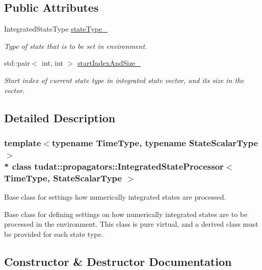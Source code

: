 \subsection*{Public Attributes}
\begin{DoxyCompactItemize}
\item 
Integrated\+State\+Type \hyperlink{classtudat_1_1propagators_1_1IntegratedStateProcessor_aa37431c3c4e60e9f922cc70737d5de47}{state\+Type\+\_\+}\hypertarget{classtudat_1_1propagators_1_1IntegratedStateProcessor_aa37431c3c4e60e9f922cc70737d5de47}{}\label{classtudat_1_1propagators_1_1IntegratedStateProcessor_aa37431c3c4e60e9f922cc70737d5de47}

\begin{DoxyCompactList}\small\item\em Type of state that is to be set in environment. \end{DoxyCompactList}\item 
std\+::pair$<$ int, int $>$ \hyperlink{classtudat_1_1propagators_1_1IntegratedStateProcessor_ae03065ec333ec767023e999ff2f884e5}{start\+Index\+And\+Size\+\_\+}
\begin{DoxyCompactList}\small\item\em Start index of current state type in integrated state vector, and its size in the vector. \end{DoxyCompactList}\end{DoxyCompactItemize}


\subsection{Detailed Description}
\subsubsection*{template$<$typename Time\+Type, typename State\+Scalar\+Type$>$\\*
class tudat\+::propagators\+::\+Integrated\+State\+Processor$<$ Time\+Type, State\+Scalar\+Type $>$}

Base class for settings how numerically integrated states are processed. 

Base class for defining settings on how numerically integrated states are to be processed in the environment. This class is pure virtual, and a derived class must be provided for each state type. 

\subsection{Constructor \& Destructor Documentation}
